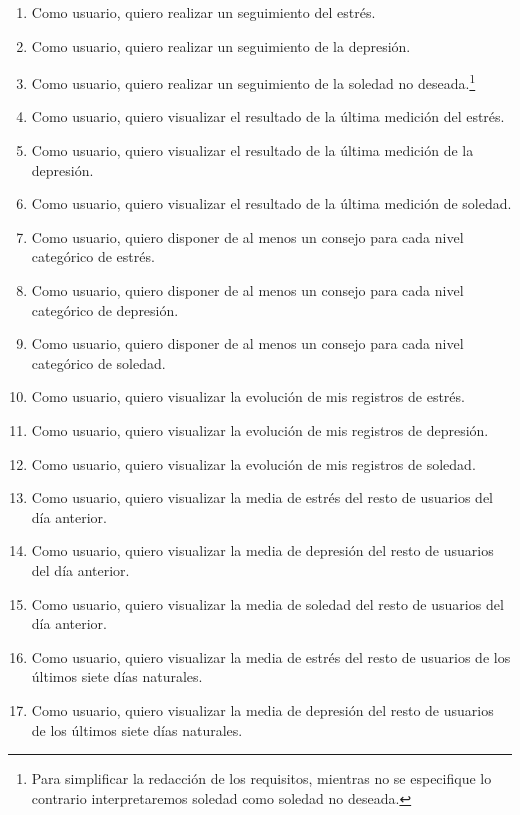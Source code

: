         \begin{enumerate}[label=\textbf{\texttt{RU-\arabic*}}]
            \item Como usuario, quiero realizar un seguimiento del estrés.
            \item Como usuario, quiero realizar un seguimiento de la depresión.
            \item Como usuario, quiero realizar un seguimiento de la soledad no deseada.\footnote{Para simplificar la redacción de los requisitos, mientras no se especifique lo contrario interpretaremos soledad como soledad no deseada.}
            \item Como usuario, quiero visualizar el resultado de la última medición del estrés.
            \item Como usuario, quiero visualizar el resultado de la última medición de la depresión.
            \item Como usuario, quiero visualizar el resultado de la última medición de soledad.
            \item Como usuario, quiero disponer de al menos un consejo para cada nivel categórico de estrés.
            \item Como usuario, quiero disponer de al menos un consejo para cada nivel categórico de depresión.
            \item Como usuario, quiero disponer de al menos un consejo para cada nivel categórico de soledad.
            \item Como usuario, quiero visualizar la evolución de mis registros de estrés.
            \item Como usuario, quiero visualizar la evolución de mis registros de depresión.
            \item Como usuario, quiero visualizar la evolución de mis registros de soledad.
            \item Como usuario, quiero visualizar la media de estrés del resto de usuarios del día anterior.
            \item Como usuario, quiero visualizar la media de depresión del resto de usuarios del día anterior.
            \item Como usuario, quiero visualizar la media de soledad del resto de usuarios del día anterior.
            \item Como usuario, quiero visualizar la media de estrés del resto de usuarios de los últimos siete días naturales.
            \item Como usuario, quiero visualizar la media de depresión del resto de usuarios de los últimos siete días naturales.

\end{enumerate}
